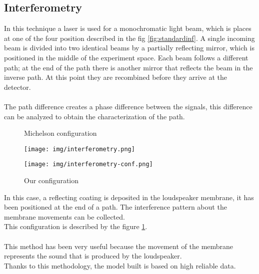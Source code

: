 \subsection{Interferometry}
In this technique a laser is used for a monochromatic light beam, which is places at one of the four position described in the fig \ref{fig:standardinf}. A single incoming beam is divided into two identical beams by a partially reflecting mirror, which is positioned in the middle of the experiment space. Each beam follows a different path; at the end of the path there is another mirror that reflects the beam in the inverse path. At this point they are recombined before they arrive at the detector.\\\\
The path difference creates a phase difference between the signals, this difference can be analyzed to obtain the characterization of the path.
\begin{figure}[h]
\begin{minipage}{.5\textwidth}
\caption{Michelson configuration}\label{fig:standardinf}
\texttt{[image: img/interferometry.png]} 
\end{minipage}
\begin{minipage}{.5\textwidth}
\caption{Our configuration}\label{fig:ourinf}
\texttt{[image: img/interferometry-conf.png]} 
\end{minipage}
\end{figure}
In this case, a reflecting coating is deposited in the loudspeaker membrane, it has been positioned at the end of a path. The interference pattern about the membrane movements can be collected.\\
This configuration is described by the figure \ref{fig:ourinf}.\\\\
This method has been very useful because the movement of the membrane represents the sound that is produced by the loudspeaker.\\
Thanks to this methodology, the model built is based on high reliable data.

